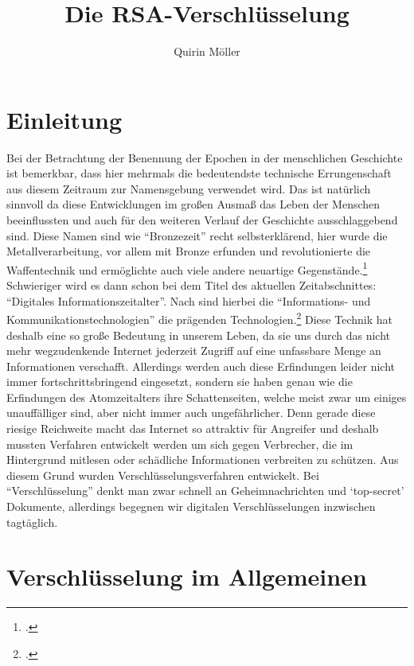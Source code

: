 \documentclass{scrarticle}
\title{Die RSA-Verschlüsselung}
\author{Quirin Möller}
\begin{document}
    
    \maketitle
    \newpage
    \tableofcontents
    \newpage
    \setcounter{page}{4}

    \section{Einleitung}
    Bei der Betrachtung der Benennung der Epochen in der menschlichen Geschichte ist bemerkbar, dass hier mehrmals die bedeutendste technische Errungenschaft aus diesem Zeitraum zur Namensgebung verwendet wird. Das ist natürlich sinnvoll da diese Entwicklungen im großen Ausmaß das Leben der Menschen beeinflussten und auch für den weiteren Verlauf der Geschichte ausschlaggebend sind. Diese Namen sind  wie \enquote{Bronzezeit} recht selbsterklärend, hier wurde die Metallverarbeitung, vor allem mit Bronze erfunden und revolutionierte die Waffentechnik und ermöglichte auch viele andere neuartige Gegenstände.\footcite{BronzezeitEuropaDeutschland} 
    Schwieriger wird es dann schon bei dem Titel des aktuellen Zeitabschnittes: \enquote{Digitales Informationszeitalter}. Nach  sind hierbei die \enquote{Informations- und Kommunikationstechnologien} die prägenden Technologien.\footcite{jornlengsfeld}
    Diese Technik hat deshalb eine so große Bedeutung in unserem Leben, da sie uns durch das nicht mehr wegzudenkende Internet jederzeit Zugriff auf eine unfassbare Menge an Informationen verschafft. Allerdings werden auch diese Erfindungen leider nicht immer fortschrittsbringend eingesetzt, sondern sie haben genau wie die Erfindungen des Atomzeitalters ihre Schattenseiten, welche meist zwar um einiges unauffälliger sind, aber nicht immer auch ungefährlicher. Denn gerade diese riesige Reichweite macht das Internet so attraktiv für Angreifer und deshalb mussten Verfahren entwickelt werden um sich gegen Verbrecher, die im Hintergrund mitlesen oder schädliche Informationen verbreiten zu schützen. Aus diesem Grund wurden Verschlüsselungsverfahren entwickelt. Bei \enquote{Verschlüsselung} denkt man zwar schnell an Geheimnachrichten und \enquote*{top-secret} Dokumente, allerdings begegnen wir digitalen Verschlüsselungen inzwischen tagtäglich.

    \section[Verschlüsselung allgemein]{Verschlüsselung im Allgemeinen}
\end{document}
